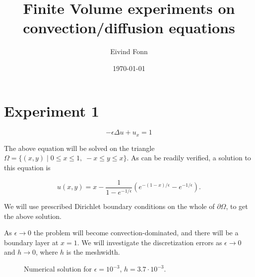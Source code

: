 \documentclass[a4paper,10pt]{article}
\title{Finite Volume experiments on convection/diffusion equations}
\author{Eivind Fonn}
\date{\today}
\begin{document}
\maketitle


\section{Experiment 1}

\[-\epsilon\Delta u + u_x = 1\]

The above equation will be solved on the triangle
$\Omega = \{(x,y)\;|\;0\leq x\leq1,\;-x\leq y\leq x\}$. As can be readily verified,
a solution to this equation is

\[ u(x,y) = x - \frac{1}{1-e^{-1/\epsilon}}\left(e^{-(1-x)/\epsilon}-e^{-1/\epsilon}\right). \]

We will use prescribed Dirichlet boundary conditions on the whole of $\partial\Omega$, to get
the above solution.

As $\epsilon\to0$ the problem will become convection-dominated, and there will be a boundary layer
at $x=1$. We will investigate the discretization errors as $\epsilon\to0$ and $h\to0$, where
$h$ is the meshwidth.

\begin{figure}[!ht]
\centering
{}
\caption{Numerical solution for $\epsilon=10^{-3}$, $h=3.7\cdot10^{-3}$.}
\end{figure}
\end{document}

